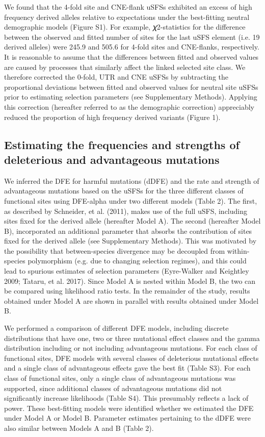We found that the 4-fold site and CNE-flank uSFSs exhibited an excess of high frequency derived alleles relative to expectations under the best-fitting neutral demographic models (Figure S1). For example, 𝜒2-statistics for the difference between the observed and fitted number of sites for the last uSFS element (i.e. 19 derived alleles) were 245.9 and 505.6 for 4-fold sites and CNE-flanks, respectively. It is reasonable to assume that the differences between fitted and observed values are caused by processes that similarly affect the linked selected site class. We therefore corrected the 0-fold, UTR and CNE uSFSs by subtracting the proportional deviations between fitted and observed values for neutral site uSFSs prior to estimating selection parameters (see Supplementary Methods). Applying this correction (hereafter referred to as the demographic correction) appreciably reduced the proportion of high frequency derived variants (Figure 1).

\subsection{Estimating the frequencies and strengths of deleterious and advantageous mutations}

We inferred the DFE for harmful mutations (dDFE) and the rate and strength of advantageous mutations based on the uSFSs for the three different classes of functional sites using DFE-alpha under two different models (Table 2). The first, as described by Schneider, et al. (2011), makes use of the full uSFS, including sites fixed for the derived allele (hereafter Model A). The second (hereafter Model B), incorporated an additional parameter that absorbs the contribution of sites fixed for the derived allele (see Supplementary Methods). This was motivated by the possibility that between-species divergence may be decoupled from within-species polymorphism (e.g. due to changing selection regimes), and this could lead to spurious estimates of selection parameters (Eyre-Walker and Keightley 2009; Tataru, et al. 2017). Since Model A is nested within Model B, the two can be compared using likelihood ratio tests. In the remainder of the study, results obtained under Model A are shown in parallel with results obtained under Model B. 

We performed a comparison of different DFE models, including discrete distributions that have one, two or three mutational effect classes and the gamma distribution including or not including advantageous mutations. For each class of functional sites, DFE models with several classes of deleterious mutational effects and a single class of advantageous effects gave the best fit (Table S3). For each class of functional sites, only a single class of advantageous mutations was supported, since additional classes of advantageous mutations did not significantly increase likelihoods (Table S4). This presumably reflects a lack of power. These best-fitting models were identified whether we estimated the DFE under Model A or Model B. Parameter estimates pertaining to the dDFE were also similar between Models A and B (Table 2). 

